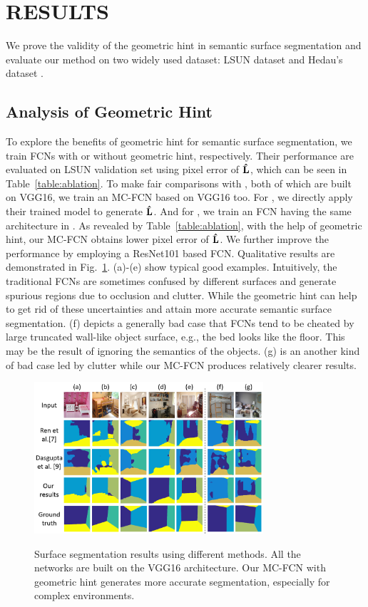 \section{RESULTS}
\label{sec:Res}

We prove the validity of the geometric hint in semantic surface segmentation and evaluate our method on two widely used dataset: LSUN dataset \cite{zhang2015large} and Hedau's dataset \cite{hedau2009recovering}. 

\subsection{Analysis of Geometric Hint}
\label{sec:ablation}
To explore the benefits of geometric hint for semantic surface segmentation, we train FCNs with or without geometric hint, respectively. Their performance are evaluated on LSUN validation set using pixel error of $\mathbf{\hat{L}}$, which can be seen in Table~\ref{table:ablation}. To make fair comparisons with \cite{ren2016coarse, dasgupta2016delay}, both of which are built on VGG16, we train an MC-FCN based on VGG16 too. For \cite{ren2016coarse}, we directly apply their trained model to generate $\mathbf{\hat{L}}$. And for \cite{dasgupta2016delay}, we train an FCN having the same architecture in \cite{dasgupta2016delay}. As revealed by Table~\ref{table:ablation}, with the help of geometric hint, our MC-FCN obtains lower pixel error of $\mathbf{\hat{L}}$. We further improve the performance by employing a ResNet101 \cite{he2016deep} based FCN. Qualitative results are demonstrated in Fig.~\ref{fig:fcn-comparison}. (a)-(e) show typical good examples. Intuitively, the traditional FCNs are sometimes confused by different surfaces and generate spurious regions due to occlusion and clutter. While the geometric hint can help to get rid of these uncertainties and attain more accurate semantic surface segmentation. (f) depicts a generally bad case that FCNs tend to be cheated by large truncated wall-like object surface, e.g., the bed looks like the floor. This may be the result of ignoring the semantics of the objects. (g) is an another kind of bad case led by clutter while our MC-FCN produces relatively clearer results.  

\begin{figure}[!ht]
	\centering 
	\textsc{\includegraphics[width=8.5cm]{figure/compare1.png}}
	\caption{Surface segmentation results using different methods. All the networks are built on the VGG16 architecture. Our MC-FCN with geometric hint generates more accurate segmentation, especially  for complex environments.}
	\label{fig:fcn-comparison}
\end{figure}

